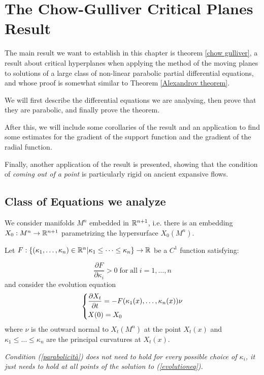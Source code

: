 \chapter{The Chow-Gulliver Critical Planes Result}

The main result we want to establish in this chapter is theorem \ref{chow gulliver}, a result about critical hyperplanes when applying the method of the moving planes to solutions of a large class of non-linear parabolic partial differential equations, and whose proof is somewhat similar to Theorem \ref{Alexandrov theorem}. 

We will first describe the differential equations we are analysing, then prove that they are parabolic, and finally prove the theorem. 

After this, we will include some corollaries of the result and an application to find some estimates for the gradient of the support function and the gradient of the radial function. 

Finally, another application of the result is presented, showing that the condition of \textit{coming out of a point} is particularly rigid on ancient expansive flows. 

\section{Class of Equations we analyze}

We consider manifolds $M^n$ embedded in $\mathbb{R}^{n+1}$, i.e. there is an embedding $X_0 : M^n \rightarrow \mathbb{R}^{n+1}$ parametrizing the hypersurface $X_0(M^n)$. 

Let $F:\{(\kappa_1, \dots , \kappa_n)\in \mathbb{R}^n\vert \kappa_1\leq \dots \leq \kappa_n\}\rightarrow \mathbb{R}$ be a $C^1$ function satisfying:

\begin{equation}
	\frac{\partial F}{\partial \kappa_i} > 0 \mathrm{\; for \; all } \; i=1,\dots, n \label{parabolicità}
\end{equation}
and consider the evolution equation 
\begin{align}
	\begin{dcases}
		\frac{\partial X_t}{\partial t} = - F(\kappa_1(x), \dots , \kappa_n(x)) \nu\\
		X(0)= X_0
	\end{dcases} \label{evolutioneq}
\end{align}
where $\nu$ is the outward normal to $X_t(M^n)$ at the point $X_t(x)$ and $\kappa_1\leq \dots \leq \kappa_n$ are the principal curvatures at $X_t(x)$. 
\begin{oss}\em
	Condition (\ref{parabolicità}) does not need to hold for every possible choice of $\kappa_i$, it just needs to hold at all points of the solution to (\ref{evolutioneq}). 
\end{oss}
